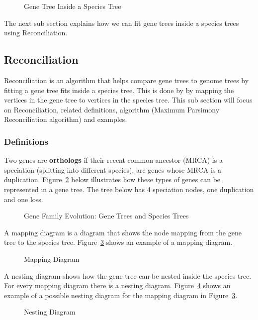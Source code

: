 \begin{figure}[H]
  \centering
  \caption{Gene Tree Inside a Species Tree}
  \label{GeneSpecies}
\end{figure}
The next sub section explains how we can fit gene trees inside a species trees using Reconciliation.

\subsection{Reconciliation}

\noindent Reconciliation is an algorithm that helps compare gene trees to genome trees by fitting a gene tree fits inside a species tree. This is done by by mapping the vertices in the gene tree to vertices in the species tree. This sub section will focus on Reconciliation, related definitions, algorithm (Maximum Parsimony Reconciliation algorithm) and examples. 
\subsubsection{Definitions}
Two genes are {\bf orthologs} if their recent common ancestor (MRCA) is a speciation (splitting into different species).
 are genes whose MRCA is a duplication.
\newline Figure~\ref{Fig07_GeneFamilyEvolution} below illustrates how these types of genes can be represented in a gene tree. The tree below has 4 speciation nodes, one duplication and one loss.
 
\begin{figure}[H]
  \centering
  \caption{Gene Family Evolution: Gene Trees and Species Trees}
  \label{Fig07_GeneFamilyEvolution}
\end{figure}

A mapping diagram is a diagram that shows the node mapping from the gene tree to the species tree. Figure~\ref{MappingDiagram} shows an example of a mapping diagram.

\begin{figure}[H]
  \centering
  \caption{Mapping Diagram}
  \label{MappingDiagram}
\end{figure}

A nesting diagram shows how the gene tree can be nested inside the species tree. For every mapping diagram there is a nesting diagram. Figure~\ref{NestingDiagram} shows an example of a possible nesting diagram for the mapping diagram in Figure~\ref{MappingDiagram}.
\begin{figure}[H]
  \centering
  \caption{Nesting Diagram}
  \label{NestingDiagram}
\end{figure}

